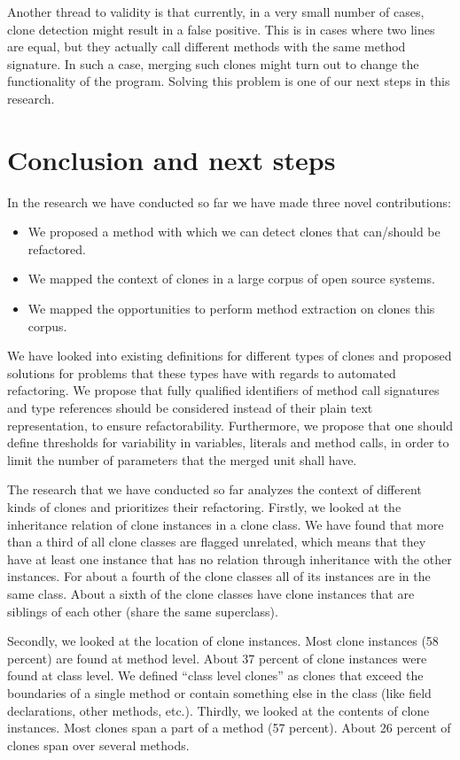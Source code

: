 \documentclass[a4paper]{article}
\begin{document}
Another thread to validity is that currently, in a very small number of cases, clone detection might result in a false positive. This is in cases where two lines are equal, but they actually call different methods with the same method signature. In such a case, merging such clones might turn out to change the functionality of the program. Solving this problem is one of our next steps in this research.

\section{Conclusion and next steps}\label{chap:conclusion}
In the research we have conducted so far we have made three novel contributions:
\begin{itemize}
    \item We proposed a method with which we can detect clones that can/should be refactored.
    \item We mapped the context of clones in a large corpus of open source systems.
    \item We mapped the opportunities to perform method extraction on clones this corpus.
\end{itemize}

We have looked into existing definitions for different types of clones \cite{roy2007survey} and proposed solutions for problems that these types have with regards to automated refactoring. We propose that fully qualified identifiers of method call signatures and type references should be considered instead of their plain text representation, to ensure refactorability. Furthermore, we propose that one should define thresholds for variability in variables, literals and method calls, in order to limit the number of parameters that the merged unit shall have.

The research that we have conducted so far analyzes the context of different kinds of clones and prioritizes their refactoring. Firstly, we looked at the inheritance relation of clone instances in a clone class. We have found that more than a third of all clone classes are flagged unrelated, which means that they have at least one instance that has no relation through inheritance with the other instances. For about a fourth of the clone classes all of its instances are in the same class. About a sixth of the clone classes have clone instances that are siblings of each other (share the same superclass).

Secondly, we looked at the location of clone instances. Most clone instances (58 percent) are found at method level. About 37 percent of clone instances were found at class level. We defined ``class level clones'' as clones that exceed the boundaries of a single method or contain something else in the class (like field declarations, other methods, etc.). Thirdly, we looked at the contents of clone instances. Most clones span a part of a method (57 percent). About 26 percent of clones span over several methods.
\end{document}

